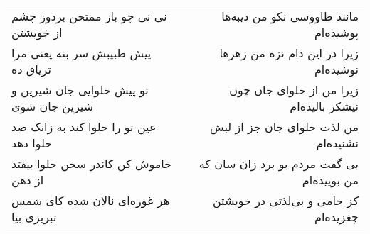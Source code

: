 \begin{center}
\begin{longtable}{l p{0.5cm} r}
نی نی چو باز ممتحن بردوز چشم از خویشتن
&&
مانند طاووسی نکو من دیبه‌ها پوشیده‌ام
\\
پیش طبیبش سر بنه یعنی مرا تریاق ده
&&
زیرا در این دام نزه من زهرها نوشیده‌ام
\\
تو پیش حلوایی جان شیرین و شیرین جان شوی
&&
زیرا من از حلوای جان چون نیشکر بالیده‌ام
\\
عین تو را حلوا کند به زانک صد حلوا دهد
&&
من لذت حلوای جان جز از لبش نشنیده‌ام
\\
خاموش کن کاندر سخن حلوا بیفتد از دهن
&&
بی گفت مردم بو برد زان سان که من بوییده‌ام
\\
هر غوره‌ای نالان شده کای شمس تبریزی بیا
&&
کز خامی و بی‌لذتی در خویشتن چغزیده‌ام
\\
\end{longtable}
\end{center}
